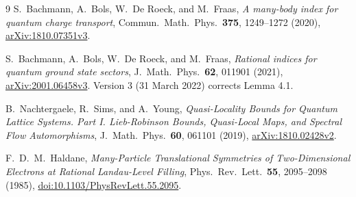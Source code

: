 \documentclass[11pt]{article}
\theoremstyle{definition}
\theoremstyle{remark}
\begin{document}
\begin{thebibliography}{9}
S.~Bachmann, A.~Bols, W.~De Roeck, and M.~Fraas,
\emph{A many-body index for quantum charge transport},
Commun.\ Math.\ Phys.\ \textbf{375}, 1249--1272 (2020),
\href{https://arxiv.org/abs/1810.07351}{arXiv:1810.07351v3}.

S.~Bachmann, A.~Bols, W.~De Roeck, and M.~Fraas,
\emph{Rational indices for quantum ground state sectors},
J.\ Math.\ Phys.\ \textbf{62}, 011901 (2021),
\href{https://arxiv.org/abs/2001.06458v3}{arXiv:2001.06458v3}.
Version 3 (31 March 2022) corrects Lemma 4.1.

B.~Nachtergaele, R.~Sims, and A.~Young,
\emph{Quasi-Locality Bounds for Quantum Lattice Systems.
Part I. Lieb-Robinson Bounds, Quasi-Local Maps, and Spectral Flow
Automorphisms},
J.\ Math.\ Phys.\ \textbf{60}, 061101 (2019),
\href{https://arxiv.org/abs/1810.02428v2}{arXiv:1810.02428v2}.

F.~D.~M.~Haldane,
\emph{Many-Particle Translational Symmetries of Two-Dimensional
Electrons at Rational Landau-Level Filling},
Phys.\ Rev.\ Lett.\ \textbf{55}, 2095--2098 (1985),
\href{https://doi.org/10.1103/PhysRevLett.55.2095}
{doi:10.1103/PhysRevLett.55.2095}.
\end{thebibliography}
\end{document}
